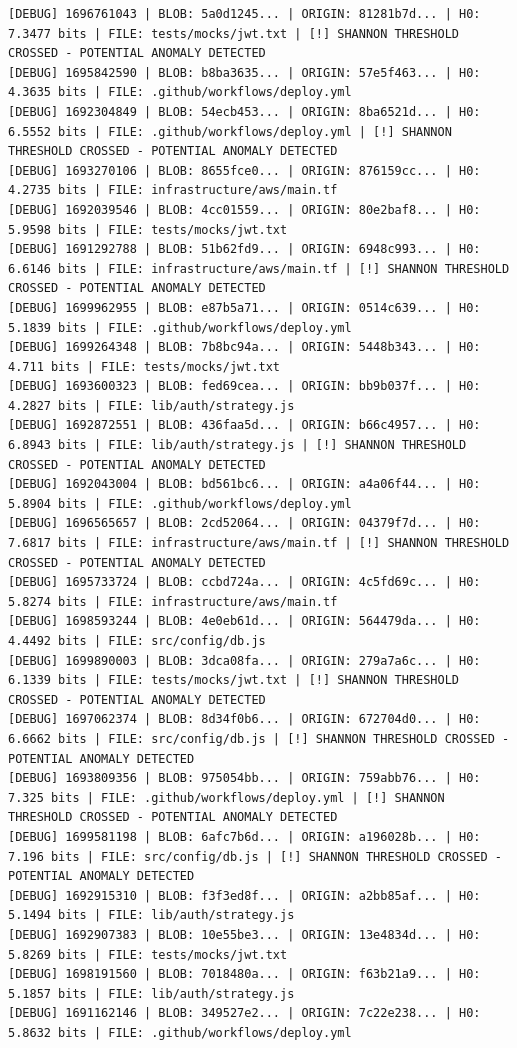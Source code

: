 \documentclass[12pt, a4paper, oneside]{report}
\begin{document}
\begin{lstlisting}[basicstyle=\tiny\ttfamily]
[DEBUG] 1696761043 | BLOB: 5a0d1245... | ORIGIN: 81281b7d... | H0: 7.3477 bits | FILE: tests/mocks/jwt.txt | [!] SHANNON THRESHOLD CROSSED - POTENTIAL ANOMALY DETECTED
[DEBUG] 1695842590 | BLOB: b8ba3635... | ORIGIN: 57e5f463... | H0: 4.3635 bits | FILE: .github/workflows/deploy.yml
[DEBUG] 1692304849 | BLOB: 54ecb453... | ORIGIN: 8ba6521d... | H0: 6.5552 bits | FILE: .github/workflows/deploy.yml | [!] SHANNON THRESHOLD CROSSED - POTENTIAL ANOMALY DETECTED
[DEBUG] 1693270106 | BLOB: 8655fce0... | ORIGIN: 876159cc... | H0: 4.2735 bits | FILE: infrastructure/aws/main.tf
[DEBUG] 1692039546 | BLOB: 4cc01559... | ORIGIN: 80e2baf8... | H0: 5.9598 bits | FILE: tests/mocks/jwt.txt
[DEBUG] 1691292788 | BLOB: 51b62fd9... | ORIGIN: 6948c993... | H0: 6.6146 bits | FILE: infrastructure/aws/main.tf | [!] SHANNON THRESHOLD CROSSED - POTENTIAL ANOMALY DETECTED
[DEBUG] 1699962955 | BLOB: e87b5a71... | ORIGIN: 0514c639... | H0: 5.1839 bits | FILE: .github/workflows/deploy.yml
[DEBUG] 1699264348 | BLOB: 7b8bc94a... | ORIGIN: 5448b343... | H0: 4.711 bits | FILE: tests/mocks/jwt.txt
[DEBUG] 1693600323 | BLOB: fed69cea... | ORIGIN: bb9b037f... | H0: 4.2827 bits | FILE: lib/auth/strategy.js
[DEBUG] 1692872551 | BLOB: 436faa5d... | ORIGIN: b66c4957... | H0: 6.8943 bits | FILE: lib/auth/strategy.js | [!] SHANNON THRESHOLD CROSSED - POTENTIAL ANOMALY DETECTED
[DEBUG] 1692043004 | BLOB: bd561bc6... | ORIGIN: a4a06f44... | H0: 5.8904 bits | FILE: .github/workflows/deploy.yml
[DEBUG] 1696565657 | BLOB: 2cd52064... | ORIGIN: 04379f7d... | H0: 7.6817 bits | FILE: infrastructure/aws/main.tf | [!] SHANNON THRESHOLD CROSSED - POTENTIAL ANOMALY DETECTED
[DEBUG] 1695733724 | BLOB: ccbd724a... | ORIGIN: 4c5fd69c... | H0: 5.8274 bits | FILE: infrastructure/aws/main.tf
[DEBUG] 1698593244 | BLOB: 4e0eb61d... | ORIGIN: 564479da... | H0: 4.4492 bits | FILE: src/config/db.js
[DEBUG] 1699890003 | BLOB: 3dca08fa... | ORIGIN: 279a7a6c... | H0: 6.1339 bits | FILE: tests/mocks/jwt.txt | [!] SHANNON THRESHOLD CROSSED - POTENTIAL ANOMALY DETECTED
[DEBUG] 1697062374 | BLOB: 8d34f0b6... | ORIGIN: 672704d0... | H0: 6.6662 bits | FILE: src/config/db.js | [!] SHANNON THRESHOLD CROSSED - POTENTIAL ANOMALY DETECTED
[DEBUG] 1693809356 | BLOB: 975054bb... | ORIGIN: 759abb76... | H0: 7.325 bits | FILE: .github/workflows/deploy.yml | [!] SHANNON THRESHOLD CROSSED - POTENTIAL ANOMALY DETECTED
[DEBUG] 1699581198 | BLOB: 6afc7b6d... | ORIGIN: a196028b... | H0: 7.196 bits | FILE: src/config/db.js | [!] SHANNON THRESHOLD CROSSED - POTENTIAL ANOMALY DETECTED
[DEBUG] 1692915310 | BLOB: f3f3ed8f... | ORIGIN: a2bb85af... | H0: 5.1494 bits | FILE: lib/auth/strategy.js
[DEBUG] 1692907383 | BLOB: 10e55be3... | ORIGIN: 13e4834d... | H0: 5.8269 bits | FILE: tests/mocks/jwt.txt
[DEBUG] 1698191560 | BLOB: 7018480a... | ORIGIN: f63b21a9... | H0: 5.1857 bits | FILE: lib/auth/strategy.js
[DEBUG] 1691162146 | BLOB: 349527e2... | ORIGIN: 7c22e238... | H0: 5.8632 bits | FILE: .github/workflows/deploy.yml
\end{lstlisting}
\end{document}
